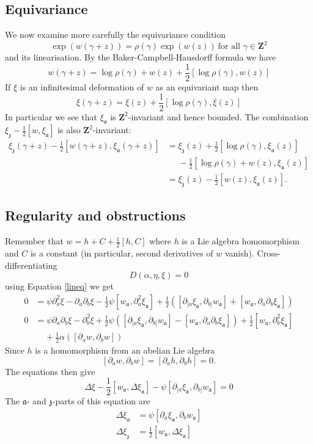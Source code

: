 \documentclass[11pt]{amsart}
\newcommand{\ZZ}{\mathbf{Z}}
\renewcommand{\aa}{\mathfrak{a}}
\newcommand{\zz}{\mathfrak{z}}
\numberwithin{equation}{section}
\theoremstyle{definition}
\theoremstyle{remark}
\begin{document}
\subsection{Equivariance}\label{equivar}
We now examine more carefully the equivariance condition
\[\exp(w(\gamma+z))=\rho(\gamma)\exp(w(z))\ \mbox{for all }\gamma\in\ZZ^2\]
and its linearisation. By the Baker-Campbell-Hausdorff formula we have
\[w(\gamma+z)=\log\rho(\gamma)+w(z)+\frac{1}{2}[\log\rho(\gamma),w(z)]\]
If $\xi$ is an infinitesimal deformation of $w$ as an equivariant map then
\[\xi(\gamma+z)=\xi(z)+\frac{1}{2}[\log\rho(\gamma),\xi(z)]\]
In particular we see that $\xi_{\aa}$ is $\ZZ^2$-invariant and hence bounded. The combination $\xi_{\zz}-\frac{1}{2}[w,\xi_{\aa}]$ is also $\ZZ^2$-invariant:
\begin{align*}
\xi_{\zz}(\gamma+z)-\frac{1}{2}[w(\gamma+z),\xi_{\aa}(\gamma+z)]&=\xi_{\zz}(z)+\frac{1}{2}[\log\rho(\gamma),\xi_{\aa}(z)]\\
&\ \ \ \ \ \ -\frac{1}{2}[\log\rho(\gamma)+w(z),\xi_{\aa}(z)]\\
&=\xi_{\zz}(z)-\frac{1}{2}[w(z),\xi_{\aa}(z)].
\end{align*}


\subsection{Regularity and obstructions}\label{regobs}

Remember that $w=h+C+\frac{1}{2}[h,C]$ where $h$ is a Lie algebra homomorphism and $C$ is a constant (in particular, second derivatives of $w$ vanish). Cross-differentiating
\[D(\alpha,\eta,\xi)=0\]
using Equation \eqref{lineq} we get
\begin{align*}
0&=\psi\partial_a^2\xi-\partial_a\partial_b\xi-\frac{1}{2}\psi[w_{\aa},\partial_a^2\xi_{\aa}]+\frac{1}{2}([\partial_{[a}\xi_{\aa},\partial_{b]}w_{\aa}]+[w_{\aa},\partial_a\partial_b\xi_{\aa}])\\
0&=\psi\partial_a\partial_b\xi-\partial_b^2\xi+\frac{1}{2}\psi([\partial_{[a}\xi_{\aa},\partial_{b]}w_{\aa}]-[w_{\aa},\partial_a\partial_b\xi_{\aa}])+\frac{1}{2}[w_{\aa},\partial_b^2\xi_{\aa}]\\
&\ \ \ \ \ +\frac{1}{2}\alpha([\partial_aw,\partial_bw])
\end{align*}
Since $h$ is a homomorphism from an abelian Lie algebra
\[[\partial_aw,\partial_bw]=[\partial_ah,\partial_bh]=0.\]
The equations then give
\[\Delta\xi-\frac{1}{2}[w_{\aa},\Delta\xi_{\aa}]-\psi[\partial_{[a}\xi_{\aa},\partial_{b]}w_{\aa}]=0\]
The $\aa$- and $\zz$-parts of this equation are
\begin{align*}
\Delta\xi_{\aa}&=\psi[\partial_{a}\xi_{\aa},\partial_{b}w_{\aa}]\\
\Delta\xi_{\zz}&=\frac{1}{2}[w_{\aa},\Delta\xi_{\aa}]
\end{align*}
\end{document}
